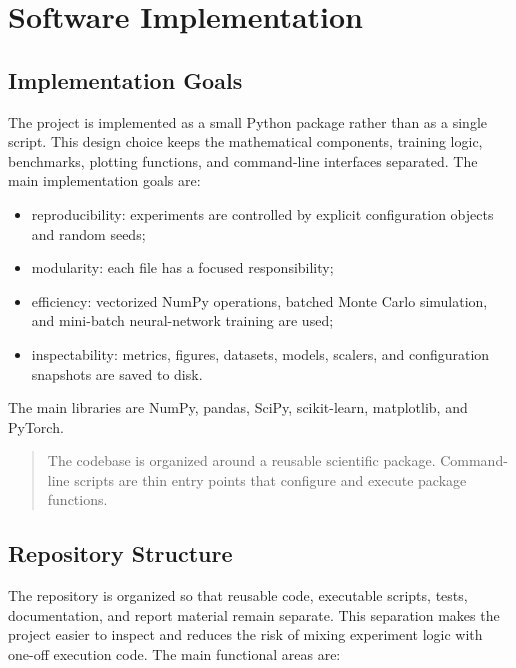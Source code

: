 \chapter{Software Implementation}

\section{Implementation Goals}

The project is implemented as a small Python package rather than as a single script.
This design choice keeps the mathematical components, training logic, benchmarks, plotting functions, and command-line interfaces separated.
The main implementation goals are:

\begin{itemize}
    \item reproducibility: experiments are controlled by explicit configuration objects and random seeds;
    \item modularity: each file has a focused responsibility;
    \item efficiency: vectorized NumPy operations, batched Monte Carlo simulation, and mini-batch neural-network training are used;
    \item inspectability: metrics, figures, datasets, models, scalers, and configuration snapshots are saved to disk.
\end{itemize}
The main libraries are NumPy, pandas, SciPy, scikit-learn, matplotlib, and PyTorch.

\begin{quote}
    The codebase is organized around a reusable scientific package.
    Command-line scripts are thin entry points that configure and execute package functions.
\end{quote}

\section{Repository Structure}

The repository is organized so that reusable code, executable scripts, tests, documentation, and report material remain separate.
This separation makes the project easier to inspect and reduces the risk of mixing experiment logic with one-off execution code.
The main functional areas are:

